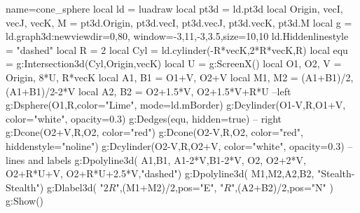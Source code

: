 \documentclass{standalone}
\begin{document}
\begin{luadraw}{name=cone_sphere}
    local ld = luadraw
    local pt3d = ld.pt3d
    local Origin, vecI, vecJ, vecK, M = pt3d.Origin, pt3d.vecI, pt3d.vecJ, pt3d.vecK, pt3d.M
    local g = ld.graph3d:new{viewdir={0,80}, window={-3,11,-3,3.5},size={10,10}}
    ld.Hiddenlinestyle = "dashed"
    local R = 2
    local Cyl = ld.cylinder(-R*vecK,2*R*vecK,R)
    local equ = g:Intersection3d(Cyl,{Origin,vecK})
    local U = g:ScreenX()
    local O1, O2, V = Origin, 8*U, R*vecK
    local A1, B1 = O1+V, O2+V
    local M1, M2 = (A1+B1)/2, (A1+B1)/2-2*V    
    local A2, B2 = O2+1.5*V, O2+1.5*V+R*U
    --left
    g:Dsphere(O1,R,{color="Lime", mode=ld.mBorder})
    g:Dcylinder(O1-V,R,O1+V, {color="white", opacity=0.3})
    g:Dedges(equ, {hidden=true})
    -- right
    g:Dcone(O2+V,R,O2, {color="red"})
    g:Dcone(O2-V,R,O2, {color="red", hiddenstyle="noline"})
    g:Dcylinder(O2-V,R,O2+V, {color="white", opacity=0.3})
    -- lines and labels
    g:Dpolyline3d({ {A1,B1}, {A1-2*V,B1-2*V}, {O2, O2+2*V}, 
        {O2+R*U+V, O2+R*U+2.5*V}},"dashed")
    g:Dpolyline3d( {{M1,M2},{A2,B2}}, "Stealth-Stealth")
    g:Dlabel3d( "$2R$",(M1+M2)/2,{pos="E"}, "$R$",(A2+B2)/2,{pos="N"} )
    g:Show()
\end{luadraw}
\end{document}
